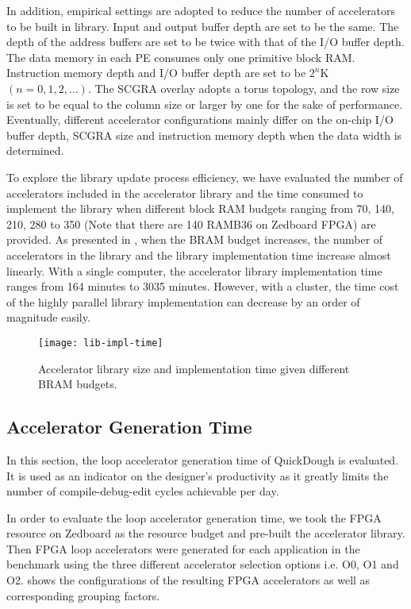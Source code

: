 In addition, empirical settings are adopted to reduce the number of accelerators to be built in
library. Input and output buffer depth are set to be the same. The depth of the address buffers are
set to be twice with that of the I/O buffer depth. The data memory in each PE consumes only one
primitive block RAM. Instruction memory depth and I/O buffer depth are set to be $2^n$K $(n=0,1,2,
...)$. The SCGRA overlay adopts a torus topology, and the row size is set to be equal
to the column size or larger by one for the sake of performance. Eventually, different accelerator
configurations mainly differ on the on-chip I/O buffer depth, SCGRA size and instruction memory depth
when the data width is determined. 

To explore the library update process efficiency, we have evaluated the number of accelerators included in
the accelerator library and the time consumed to implement the library when different block RAM
budgets ranging from 70, 140, 210, 280 to 350 (Note that there are 140 RAMB36 on Zedboard FPGA) are
provided. As presented in , when the BRAM budget increases, the number of accelerators
in the library and the library implementation time increase almost linearly. With a single
computer, the accelerator library implementation time ranges from 164 minutes to 3035 minutes.
However, with a cluster, the time cost of the highly parallel library implementation can decrease by
an order of magnitude easily.

\begin{figure}
\centering
\texttt{[image: lib-impl-time]}
\caption{Accelerator library size and implementation time given different BRAM budgets.}
\label{fig:lib-impl-time}
\end{figure}

\subsection{Accelerator Generation Time} \label{subsec:acc-gen}
In this section, the loop accelerator generation time of QuickDough is evaluated. 
It is used as an indicator on the designer's productivity as it greatly limits 
the number of compile-debug-edit cycles achievable per day. 

In order to evaluate the loop accelerator generation time, we took the FPGA resource on Zedboard as
the resource budget and pre-built the accelerator library.
Then FPGA loop accelerators were generated for each application in the benchmark using the three
different accelerator selection options i.e. O0, O1 and O2.  
 shows the configurations of the resulting
FPGA accelerators as well as corresponding grouping factors. 

